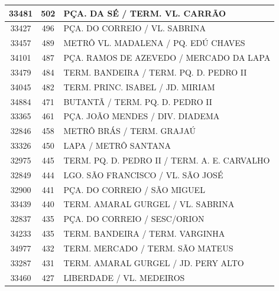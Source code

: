 \documentclass[
	12pt,				%
	oneside,			%
	a4paper,			%
	english,			%
	brazil				%
	]{abntex2ppgsi}
\begin{document}
{{\begin{apendicesenv}
\begin{longtable}{c|c|p{7cm}}
    33481 & 502   & PÇA. DA SÉ / TERM. VL. CARRÃO \\
\hline

    33427 & 496   & PÇA. DO CORREIO / VL. SABRINA \\
\hline

    33457 & 489   & METRÔ VL. MADALENA / PQ. EDÚ CHAVES \\
\hline

    34101 & 487   & PÇA. RAMOS DE AZEVEDO / MERCADO DA LAPA \\
\hline

    33479 & 484   & TERM. BANDEIRA / TERM. PQ. D. PEDRO II \\
\hline

    34045 & 482   & TERM. PRINC. ISABEL / JD. MIRIAM \\
\hline

    34884 & 471   & BUTANTÃ / TERM. PQ. D. PEDRO II \\
\hline

    33365 & 461   & PÇA. JOÃO MENDES / DIV. DIADEMA \\
\hline

    32846 & 458   & METRÔ BRÁS / TERM. GRAJAÚ \\
\hline

    33326 & 450   & LAPA / METRÔ SANTANA \\
\hline

    32975 & 445   & TERM. PQ. D. PEDRO II / TERM. A. E. CARVALHO \\
\hline

    32849 & 444   & LGO. SÃO FRANCISCO / VL. SÃO JOSÉ \\
\hline

    32900 & 441   & PÇA. DO CORREIO / SÃO MIGUEL \\
\hline

    33439 & 440   & TERM. AMARAL GURGEL / VL. SABRINA \\
\hline

    32837 & 435   & PÇA. DO CORREIO / SESC/ORION \\
\hline

    34233 & 435   & TERM. BANDEIRA / TERM. VARGINHA \\
\hline

    34977 & 432   & TERM. MERCADO / TERM. SÃO MATEUS \\
\hline

    33287 & 431   & TERM. AMARAL GURGEL / JD. PERY ALTO \\
\hline

    33460 & 427   & LIBERDADE / VL. MEDEIROS \\
\hline


\end{longtable}
\end{apendicesenv}}}
\end{document}

